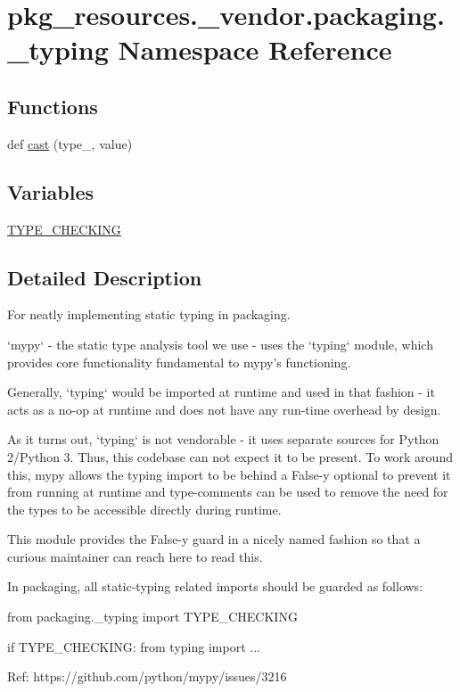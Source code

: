 \hypertarget{namespacepkg__resources_1_1__vendor_1_1packaging_1_1__typing}{}\section{pkg\+\_\+resources.\+\_\+vendor.\+packaging.\+\_\+typing Namespace Reference}
\label{namespacepkg__resources_1_1__vendor_1_1packaging_1_1__typing}
\subsection*{Functions}
\begin{DoxyCompactItemize}
\item 
def \hyperlink{namespacepkg__resources_1_1__vendor_1_1packaging_1_1__typing_ab6c0e0d6e7975110ce1c4a488e60f4b4}{cast} (type\+\_\+, value)
\end{DoxyCompactItemize}
\subsection*{Variables}
\begin{DoxyCompactItemize}
\item 
\hyperlink{namespacepkg__resources_1_1__vendor_1_1packaging_1_1__typing_a19a4a82032adee2aac99267267e98f66}{T\+Y\+P\+E\+\_\+\+C\+H\+E\+C\+K\+I\+NG}
\end{DoxyCompactItemize}


\subsection{Detailed Description}
\begin{DoxyVerb}For neatly implementing static typing in packaging.

`mypy` - the static type analysis tool we use - uses the `typing` module, which
provides core functionality fundamental to mypy's functioning.

Generally, `typing` would be imported at runtime and used in that fashion -
it acts as a no-op at runtime and does not have any run-time overhead by
design.

As it turns out, `typing` is not vendorable - it uses separate sources for
Python 2/Python 3. Thus, this codebase can not expect it to be present.
To work around this, mypy allows the typing import to be behind a False-y
optional to prevent it from running at runtime and type-comments can be used
to remove the need for the types to be accessible directly during runtime.

This module provides the False-y guard in a nicely named fashion so that a
curious maintainer can reach here to read this.

In packaging, all static-typing related imports should be guarded as follows:

    from packaging._typing import TYPE_CHECKING

    if TYPE_CHECKING:
from typing import ...

Ref: https://github.com/python/mypy/issues/3216
\end{DoxyVerb}
 

